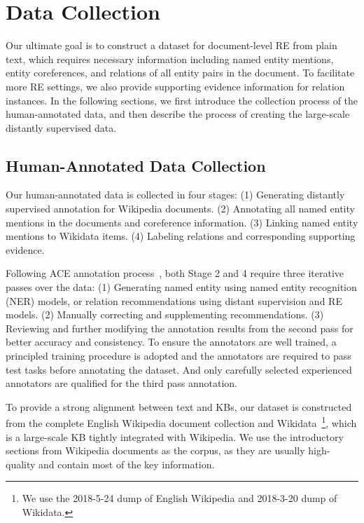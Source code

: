 \documentclass[11pt,a4paper]{article}
\begin{document}
\section{Data Collection}
Our ultimate goal is to construct a dataset for document-level RE from plain text, which requires necessary information including named entity mentions, entity coreferences, and relations of all entity pairs in the document. To facilitate more RE settings, we also provide supporting evidence information for relation instances. In the following sections, we first introduce the collection process of the human-annotated data, and then describe the process of creating the large-scale distantly supervised data.

\subsection{Human-Annotated Data Collection}
\label{Sec:Human-Annotated Data Collection}

Our human-annotated data is collected in four stages: (1) Generating distantly supervised annotation for Wikipedia documents. (2) Annotating all named entity mentions in the documents and coreference information. (3) Linking named entity mentions to Wikidata items. (4) Labeling relations and corresponding supporting evidence. 

Following ACE annotation process~\cite{doddington2004automatic}, both Stage 2 and 4 require three iterative passes over the data: (1) Generating named entity using named entity recognition (NER) models, or relation recommendations using distant supervision and RE models. (2) Manually correcting and supplementing recommendations. (3) Reviewing and further modifying the annotation results from the second pass for better accuracy and consistency. To ensure the annotators are well trained, a principled training procedure is adopted and the annotators are required to pass test tasks before annotating the dataset. And only carefully selected experienced annotators are qualified for the third pass annotation.

To provide a strong alignment between text and KBs, our dataset is constructed from the complete English Wikipedia document collection and Wikidata~\footnote{We use the 2018-5-24 dump of English Wikipedia and 2018-3-20 dump of Wikidata.}, which is a large-scale KB tightly integrated with Wikipedia. We use the introductory sections from Wikipedia documents as the corpus, as they are usually high-quality and contain most of the key information. 
\end{document}
